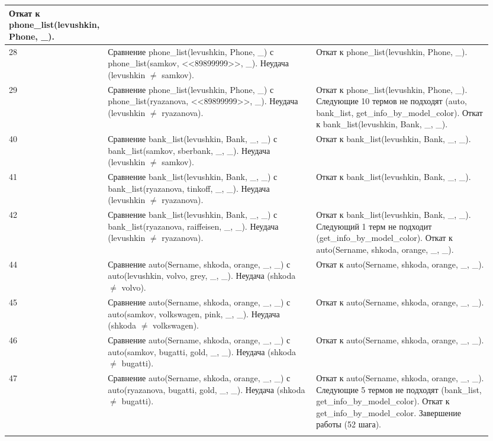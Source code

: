 \documentclass[a4paper,12pt]{article}
\begin{document}
\begin{center}
\begin{longtable}[h!]{|p{0.05\linewidth}|p{0.5\linewidth}|p{ 0.4\linewidth}|}
{					Откат к phone\_list(levushkin, Phone, \_).}\\
				\hline
				{28} & {Сравнение phone\_list(levushkin, Phone, \_) с phone\_list(samkov, <<89899999>>, \_). Неудача (levushkin $\neq$ samkov).} & {Откат к phone\_list(levushkin, Phone, \_).}\\
				\hline
				{29} & {Сравнение phone\_list(levushkin, Phone, \_) с phone\_list(ryazanova, <<89899999>>, \_). Неудача (levushkin $\neq$ ryazanova).} & {Откат к phone\_list(levushkin, Phone, \_). Следующие 10 термов не подходят (auto, bank\_list, get\_info\_by\_model\_color). Откат к bank\_list(levushkin, Bank, \_, \_).}\\
				\hline
				{40} & {Сравнение bank\_list(levushkin, Bank, \_, \_) с bank\_list(samkov, sberbank, \_, \_). Неудача (levushkin $\neq$ samkov).} & {Откат к bank\_list(levushkin, Bank, \_, \_).}\\
				\hline
				{41} & {Сравнение bank\_list(levushkin, Bank, \_, \_) с bank\_list(ryazanova, tinkoff, \_, \_). Неудача (levushkin $\neq$ ryazanova).} & {Откат к bank\_list(levushkin, Bank, \_, \_).}\\
				\hline
				{42} & {Сравнение bank\_list(levushkin, Bank, \_, \_) с bank\_list(ryazanova, raiffeisen, \_, \_). Неудача (levushkin $\neq$ ryazanova).} & {Откат к bank\_list(levushkin, Bank, \_, \_). Следующий 1 терм не подходит (get\_info\_by\_model\_color). Откат к auto(Sername, shkoda, orange, \_, \_).}\\
				\hline
				{44} & {Сравнение auto(Sername, shkoda, orange, \_, \_) с auto(levushkin, volvo, grey, \_, \_). Неудача (shkoda $\neq$ volvo).} & {Откат к auto(Sername, shkoda, orange, \_, \_).}\\
				\hline
				{45} & {Сравнение auto(Sername, shkoda, orange, \_, \_) с auto(samkov, volkswagen, pink, \_, \_). Неудача (shkoda $\neq$ volkswagen).} & {Откат к auto(Sername, shkoda, orange, \_, \_). }\\
				\hline
				{46} & {Сравнение auto(Sername, shkoda, orange, \_, \_) с auto(samkov, bugatti, gold, \_, \_). Неудача (shkoda $\neq$ bugatti).} & {Откат к auto(Sername, shkoda, orange, \_, \_). }\\
				\hline
				{47} & {Сравнение auto(Sername, shkoda, orange, \_, \_) с auto(ryazanova, bugatti, gold, \_, \_). Неудача (shkoda $\neq$ bugatti).} & {Откат к auto(Sername, shkoda, orange, \_, \_). Следующие 5 термов не подходят (bank\_list, get\_info\_by\_model\_color). Откат к get\_info\_by\_model\_color. Завершение работы (52 шага).}\\
				\hline
			\label{m2}
	\end{longtable}
\end{center}
\end{document}
